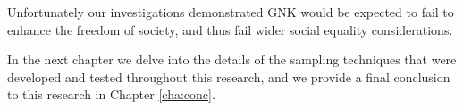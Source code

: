 Unfortunately our investigations demonstrated GNK would be expected to fail to enhance the freedom of society, and thus fail wider social equality considerations.

In the next chapter we delve into the details of the sampling techniques that were developed and tested throughout this research, and we provide a final conclusion to this research in Chapter \ref{cha:conc}. 





